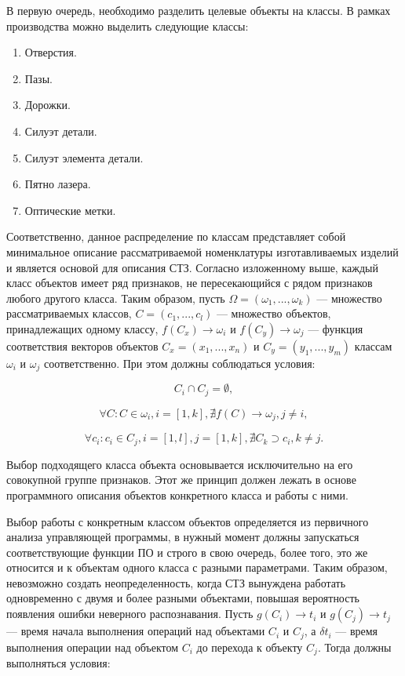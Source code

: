 В первую очередь, необходимо разделить целевые объекты на классы. В рамках производства можно выделить следующие классы:

\begin{enumerate}
	\item Отверстия.
	\item Пазы.
	\item Дорожки.
	\item Силуэт детали.
	\item Силуэт элемента детали.
	\item Пятно лазера.
	\item Оптические метки.
\end{enumerate}

Соответственно, данное распределение по классам представляет собой минимальное описание рассматриваемой номенклатуры изготавливаемых изделий и является основой для описания СТЗ. Согласно изложенному выше, каждый класс объектов имеет ряд признаков, не пересекающийся с рядом признаков любого другого класса. Таким образом, пусть $\Omega = (\omega_1, ..., \omega_k)$ --- множество рассматриваемых классов, $C = (c_1, ..., c_l)$ --- множество объектов, принадлежащих одному классу, $f(C_x) \to \omega_i$ и $f(C_y) \to \omega_j$ --- функция соответствия векторов объектов $C_x = (x_1, ..., x_n)$ и $C_y = (y_1, ..., y_m)$ классам $\omega_i$ и $\omega_j$ соответственно. При этом должны соблюдаться условия:

\begin{equation}
C_i \cap C_j = \emptyset,
\label{eq_3_13}
\end{equation}

\begin{equation}
\forall C: C \in \omega_i, i = [1, k], \nexists f(C) \to \omega_j, j \neq i,
\label{eq_3_14}
\end{equation}

\begin{equation}
\forall c_i: c_i \in C_j, i=[1, l], j=[1, k], \nexists C_k \supset c_i, k \neq j.
\label{eq_3_15}
\end{equation}

Выбор подходящего класса объекта основывается исключительно на его совокупной группе признаков. Этот же принцип должен лежать в основе программного описания объектов конкретного класса и работы с ними.

Выбор работы с конкретным классом объектов определяется из первичного анализа управляющей программы, в нужный момент должны запускаться соответствующие функции ПО и строго в свою очередь, более того, это же относится и к объектам одного класса с разными параметрами. Таким образом, невозможно создать неопределенность, когда СТЗ вынуждена работать одновременно с двумя и более разными объектами, повышая вероятность появления ошибки неверного распознавания. Пусть $g(C_i) \to t_i$ и $g(C_j) \to t_j$ --- время начала выполнения операций над объектами $C_i$ и $C_j$, а $\delta t_i$ --- время выполнения операции над объектом $C_i$ до перехода к объекту $C_j$. Тогда должны выполняться условия:

